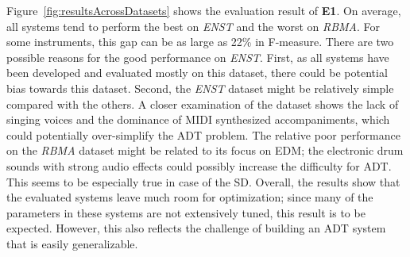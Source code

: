 \documentclass{article}
\newcommand{\comment}[1]{{\textcolor{blue}{#1}}}
\begin{document}
Figure~\ref{fig:resultsAcrossDatasets} shows the evaluation result of \textbf{E1}. On average, all systems tend to perform the best on \textit{ENST} and the worst on \textit{RBMA}. For some instruments, this gap can be as large as 22\% in F-measure. 
There are two possible reasons for the good performance on \textit{ENST}. First, as all systems have been developed and evaluated mostly on this dataset, there could be potential bias towards this dataset. Second, the \textit{ENST} dataset might be relatively simple compared with the others. A closer examination of the dataset shows the lack of singing voices and the dominance of MIDI synthesized accompaniments, which could potentially over-simplify the ADT problem. 
The relative poor performance on the \textit{RBMA} dataset might be related to its focus on EDM; the electronic drum sounds with strong audio effects could possibly increase the difficulty for ADT. This seems to be especially true in case of the SD.
Overall, the results show that the evaluated systems leave much room for optimization; since many of the parameters in these systems are not extensively tuned, this result is to be expected. However, this also reflects the challenge of building an ADT system that is easily generalizable. 

\begin{table}[]
\centering
{}
\caption{Evaluation results of the feature-learning-paradigm-based systems.}%
\label{tab:e2result}
\end{table}
\end{document}
